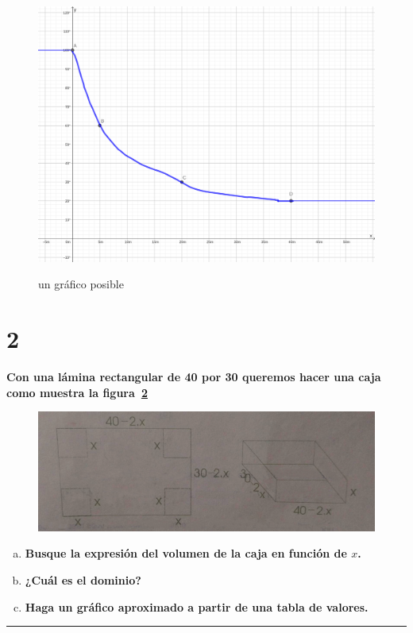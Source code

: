\documentclass{article}
\begin{document}
\newpage

\begin{figure}[ht]
\caption{un gráfico posible}
\includegraphics[scale=0.17]{../img/guide_01/ex_01.png} 
\centering
\label{fig:1}
\end{figure}

\section*{2}
\label{sec:2}

\textbf{Con una lámina rectangular de 40 por 30 queremos hacer una caja como muestra la figura~\ref{fig:2}}

\begin{figure}[ht]
\caption{}
\includegraphics[scale=2]{../img/guide_01/ex_02.png} 
\centering
\label{fig:2}
\end{figure}

\begin{enumerate}[(a)]

\item \textbf{Busque la expresión del volumen de la caja en función de $x$. }

\item \textbf{¿Cuál es el dominio?}

\item \textbf{Haga un gráfico aproximado a partir de una tabla de valores.}

\end{enumerate}
\hrule
\end{document}
